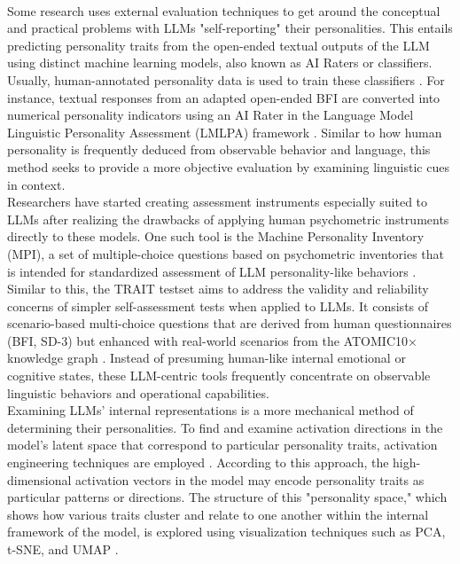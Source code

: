 \documentclass{DESSThesis}
\begin{document}
\\
Some research uses external evaluation techniques to get around the conceptual and practical problems with LLMs "self-reporting" their personalities. This entails predicting personality traits from the open-ended textual outputs of the LLM using distinct machine learning models, also known as AI Raters or classifiers. Usually, human-annotated personality data is used to train these classifiers \cite{hilliard_eliciting_2024,zheng_lmlpa_2024}. For instance, textual responses from an adapted open-ended BFI are converted into numerical personality indicators using an AI Rater in the Language Model Linguistic Personality Assessment (LMLPA) framework \cite{zheng_lmlpa_2024}. Similar to how human personality is frequently deduced from observable behavior and language, this method seeks to provide a more objective evaluation by examining linguistic cues in context.
\\
Researchers have started creating assessment instruments especially suited to LLMs after realizing the drawbacks of applying human psychometric instruments directly to these models. One such tool is the Machine Personality Inventory (MPI), a set of multiple-choice questions based on psychometric inventories that is intended for standardized assessment of LLM personality-like behaviors \cite{jiang_evaluating_2023}. Similar to this, the TRAIT testset aims to address the validity and reliability concerns of simpler self-assessment tests when applied to LLMs. It consists of scenario-based multi-choice questions that are derived from human questionnaires (BFI, SD-3) but enhanced with real-world scenarios from the ATOMIC10× knowledge graph \cite{lee_llms_2024}. Instead of presuming human-like internal emotional or cognitive states, these LLM-centric tools frequently concentrate on observable linguistic behaviors and operational capabilities.
\\
Examining LLMs' internal representations is a more mechanical method of determining their personalities. To find and examine activation directions in the model's latent space that correspond to particular personality traits, activation engineering techniques are employed \cite{allbert_identifying_2025}. According to this approach, the high-dimensional activation vectors in the model may encode personality traits as particular patterns or directions. The structure of this "personality space," which shows how various traits cluster and relate to one another within the internal framework of the model, is explored using visualization techniques such as PCA, t-SNE, and UMAP \cite{allbert_identifying_2025}.
\end{document}
